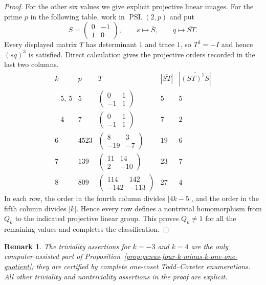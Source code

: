 \documentclass{article}
\newtheorem{remark}[theorem]{Remark}
\begin{document}
\begin{proof}
For the other six values we give explicit projective linear images.
For the prime $p$ in the following table, work in
$\operatorname{PSL}(2,p)$ and put
\[
 S=\begin{pmatrix}0&-1\\1&0\end{pmatrix},
 \qquad
 s\longmapsto\overline S,
 \qquad
 q\longmapsto\overline{ST}.
\]
Every displayed matrix $T$ has determinant $1$ and trace $1$, so
$T^3=-I$ and hence $(sq)^3$ is satisfied.  Direct calculation gives
the projective orders recorded in the last two columns.
\[
\renewcommand{\arraystretch}{1.45}
\begin{array}{c|c|c|c|c}
 k&p&T&|\overline{ST}|&|\overline{(ST)^7S}|\\ \hline
 -5,\ 5&5&
 \begin{pmatrix}0&1\\-1&1\end{pmatrix}
 &5&5\\
 -4&7&
 \begin{pmatrix}0&1\\-1&1\end{pmatrix}
 &7&2\\
 6&4523&
 \begin{pmatrix}8&3\\-19&-7\end{pmatrix}
 &19&6\\
 7&139&
 \begin{pmatrix}11&14\\2&-10\end{pmatrix}
 &23&7\\
 8&809&
 \begin{pmatrix}114&142\\-142&-113\end{pmatrix}
 &27&4
\end{array}
\]
In each row, the order in the fourth column divides $|4k-5|$, and the
order in the fifth column divides $|k|$.  Hence every row defines a
nontrivial homomorphism from $Q_k$ to the indicated projective linear
group.  This proves $Q_k\neq1$ for all the remaining values and
completes the classification.
\end{proof}

\begin{remark}
The triviality assertions for $k=-3$ and $k=4$ are the only
computer-assisted part of Proposition~\ref{prop:genus-four-k-minus-k-one-one-quotient};
they are certified by complete one-coset Todd--Coxeter enumerations.
All other triviality and nontriviality assertions in the proof are
explicit.
\end{remark}
\end{document}
